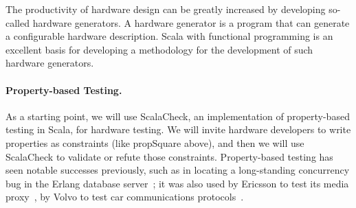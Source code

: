 \documentclass[fleqn,12pt]{article}
\newcommand{\todo}[1]{{\it TODO: #1}}
\begin{document}
The productivity of hardware design can be greatly increased by developing so-called
hardware generators. A hardware generator is a program that can generate a configurable
hardware description.
Scala with functional programming is an excellent basis for developing a methodology for the
development of such hardware generators.


\paragraph{Property-based Testing.}
As a starting point, we will use ScalaCheck, an implementation of
property-based testing in Scala, for hardware testing. We will invite
hardware developers to write properties as constraints (like
propSquare above), and then we will use ScalaCheck to validate or
refute those constraints. Property-based testing has seen notable
successes previously, such as in locating a long-standing concurrency
bug in the Erlang database server~\cite{DBLP:conf/erlang/HughesB11};
it was also used by Ericsson to test its media
proxy~\cite{DBLP:conf/erlang/ArtsHJW06}, by Volvo to test car
communications protocols~\cite{DBLP:conf/icst/ArtsHNS15}.


%
%
%
%
\end{document}
